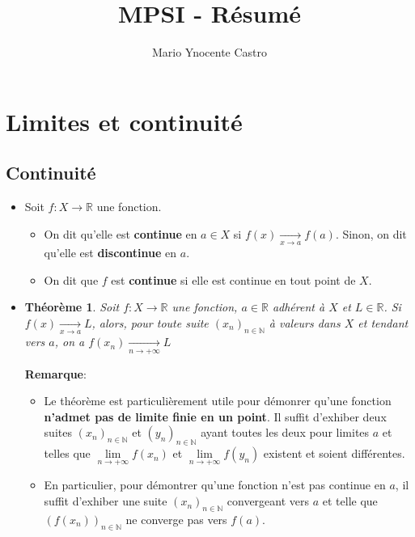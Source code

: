 \documentclass[10pt,a4paper,oneside]{article}
\newtheorem{theoreme}{Théorème}
\begin{document}
\title{MPSI - Résumé}
\author{Mario Ynocente Castro}

\maketitle

\section{Limites et continuité}

\subsection{Continuité}

\begin{itemize}
\item
Soit $f : X \to \mathbb{R}$ une fonction.

\begin{itemize}
\item
On dit qu'elle est \textbf{continue} en $a \in X$ si $f(x) \underset{x \to a}{\rightarrow} f(a)$. Sinon, on dit qu'elle est \textbf{discontinue} en $a$.

\item
On dit que $f$ est \textbf{continue} si elle est continue en tout point de $X$.

\end{itemize}

\item
\begin{theoreme}
Soit $f : X \to \mathbb{R}$ une fonction, $a \in \mathbb{R}$ adhérent à $X$ et $L \in \mathbb{R}$.
Si $f(x) \underset{x \to a}{\rightarrow} L$, alors, pour toute suite $(x_n)_{n \in \mathbb{N}}$ à valeurs dans $X$ et tendant vers $a$, on a $f(x_n) \underset{n \to +\infty}{\rightarrow} L$
\end{theoreme}

\textbf{Remarque}:

\begin{itemize}
\item
Le théorème est particulièrement utile pour démonrer qu'une fonction \textbf{n'admet pas de limite finie en un point}. Il suffit d'exhiber deux suites $(x_n)_{n \in \mathbb{N}}$ et $(y_n)_{n \in \mathbb{N}}$ ayant toutes les deux pour limites $a$ et telles que $\underset{n \to +\infty}{\lim} f(x_n)$ et $\underset{n \to +\infty}{\lim} f(y_n)$ existent et soient différentes.

\item
En particulier, pour démontrer qu'une fonction n'est pas continue en $a$, il suffit d'exhiber une suite $(x_n)_{n \in \mathbb{N}}$ convergeant vers $a$ et telle que $(f(x_n))_{n \in \mathbb{N}}$ ne converge pas vers $f(a)$.


\end{itemize}
\end{itemize}
\end{document}
